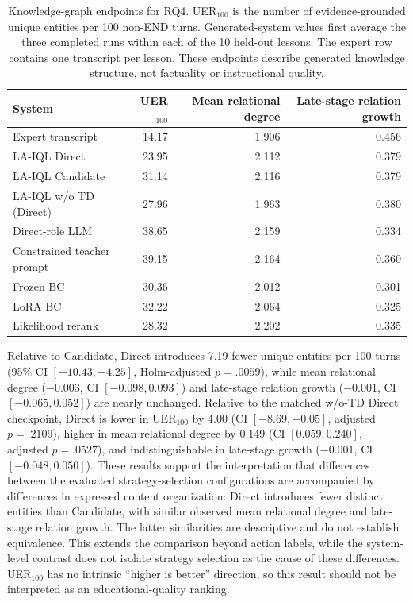 \documentclass[manuscript,review,anonymous]{acmart}
\begin{document}
\begin{table}[t]
\centering
\small
\setlength{\tabcolsep}{7pt}
\begin{tabular}{lrrr}
\toprule
System & UER$_{100}$ & Mean relational degree & Late-stage relation growth \\
\midrule
Expert transcript & 14.17 & 1.906 & 0.456 \\
LA-IQL Direct & 23.95 & 2.112 & 0.379 \\
LA-IQL Candidate & 31.14 & 2.116 & 0.379 \\
LA-IQL w/o TD (Direct) & 27.96 & 1.963 & 0.380 \\
Direct-role LLM & 38.65 & 2.159 & 0.334 \\
Constrained teacher prompt & 39.15 & 2.164 & 0.360 \\
Frozen BC & 30.36 & 2.012 & 0.301 \\
LoRA BC & 32.22 & 2.064 & 0.325 \\
Likelihood rerank & 28.32 & 2.202 & 0.335 \\
\bottomrule
\end{tabular}
\caption{Knowledge-graph endpoints for RQ4. UER$_{100}$ is the number of
evidence-grounded unique entities per 100 non-END turns. Generated-system
values first average the three completed runs within each of the 10 held-out
lessons. The expert row contains one transcript per lesson. These endpoints
describe generated knowledge structure, not factuality or instructional
quality.}
\label{tab:g4-kg-results}
\end{table}

Relative to Candidate, Direct introduces 7.19 fewer unique entities per 100
turns (95\% CI $[-10.43,-4.25]$, Holm-adjusted $p=.0059$), while mean
relational degree ($-0.003$, CI $[-0.098,0.093]$) and late-stage relation
growth ($-0.001$, CI $[-0.065,0.052]$) are nearly unchanged. Relative to the
matched w/o-TD Direct checkpoint, Direct is lower in UER$_{100}$ by 4.00
(CI $[-8.69,-0.05]$, adjusted $p=.2109$), higher in mean relational degree by
0.149 (CI $[0.059,0.240]$, adjusted $p=.0527$), and indistinguishable in
late-stage growth ($-0.001$, CI $[-0.048,0.050]$). These results support the
interpretation that differences between the evaluated strategy-selection
configurations are accompanied by differences in expressed content
organization: Direct introduces fewer distinct entities than Candidate,
with similar observed mean relational degree and late-stage relation growth.
The latter similarities are descriptive and do not establish equivalence.
This extends the comparison beyond action labels, while the system-level
contrast does not isolate strategy selection as the cause of these differences.
UER$_{100}$ has no intrinsic ``higher is better''
direction, so this result should not be interpreted as an educational-quality
ranking.
\end{document}
